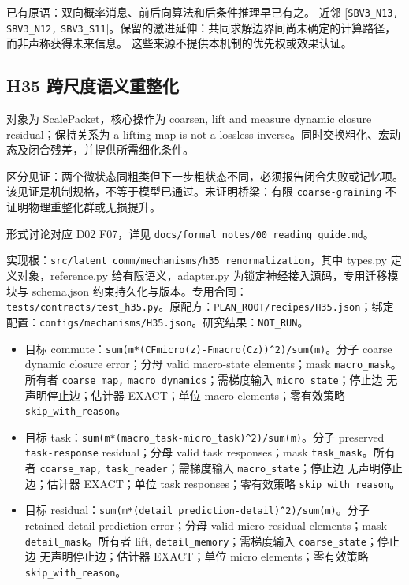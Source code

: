 \documentclass[
  10pt,
]{article}
\begin{document}
已有原语：双向概率消息、前后向算法和后条件推理早已有之。 近邻
{[}\nolinkurl{SBV3_N13,} \nolinkurl{SBV3_N12,}
\nolinkurl{SBV3_S11}{]}。保留的激进延伸：共同求解边界间尚未确定的计算路径，而非声称获得未来信息。
这些来源不提供本机制的优先权或效果认证。

\subsection{H35
跨尺度语义重整化}\label{h35-ux8de8ux5c3aux5ea6ux8bedux4e49ux91cdux6574ux5316}

对象为 ScalePacket，核心操作为 coarsen, lift and measure dynamic closure
residual；保持关系为 a lifting map is not a lossless
inverse。同时交换粗化、宏动态及闭合残差，并提供所需细化条件。

区分见证：两个微状态同粗类但下一步粗状态不同，必须报告闭合失败或记忆项。
该见证是机制规格，不等于模型已通过。未证明桥梁：有限
\nolinkurl{coarse-graining} 不证明物理重整化群或无损提升。

形式讨论对应 D02 F07，详见
{\small\nolinkurl{docs/formal_notes/00_reading_guide.md}}。

实现根：{\small\nolinkurl{src/latent_comm/mechanisms/h35_renormalization}}，其中
types.py 定义对象，reference.py 给有限语义，adapter.py
为锁定神经接入源码，专用迁移模块与 schema.json
约束持久化与版本。专用合同：{\small\nolinkurl{tests/contracts/test_h35.py}}。原配方：{\small\nolinkurl{PLAN_ROOT/recipes/H35.json}}；绑定配置：{\small\nolinkurl{configs/mechanisms/H35.json}}。研究结果：\nolinkurl{NOT_RUN}。

\begin{itemize}
\item
  目标
  commute：{\small\nolinkurl{sum(m*(C}\hspace{0.333em}\nolinkurl{Fmicro(z)-Fmacro(Cz))^2)/sum(m)}}。分子
  coarse dynamic closure error；分母 valid macro-state elements；mask
  \nolinkurl{macro_mask}。所有者 \nolinkurl{coarse_map,}
  \nolinkurl{macro_dynamics}；需梯度输入 \nolinkurl{micro_state}；停止边
  无声明停止边；估计器 EXACT；单位 macro elements；零有效策略
  \nolinkurl{skip_with_reason}。
\item
  目标
  task：{\small\nolinkurl{sum(m*(macro_task-micro_task)^2)/sum(m)}}。分子
  preserved \nolinkurl{task-response} residual；分母 valid task
  responses；mask \nolinkurl{task_mask}。所有者 \nolinkurl{coarse_map,}
  \nolinkurl{task_reader}；需梯度输入 \nolinkurl{macro_state}；停止边
  无声明停止边；估计器 EXACT；单位 task responses；零有效策略
  \nolinkurl{skip_with_reason}。
\item
  目标
  residual：{\small\nolinkurl{sum(m*(detail_prediction-detail)^2)/sum(m)}}。分子
  retained detail prediction error；分母 valid micro residual
  elements；mask \nolinkurl{detail_mask}。所有者 lift,
  \nolinkurl{detail_memory}；需梯度输入 \nolinkurl{coarse_state}；停止边
  无声明停止边；估计器 EXACT；单位 micro elements；零有效策略
  \nolinkurl{skip_with_reason}。
\end{itemize}
\end{document}
